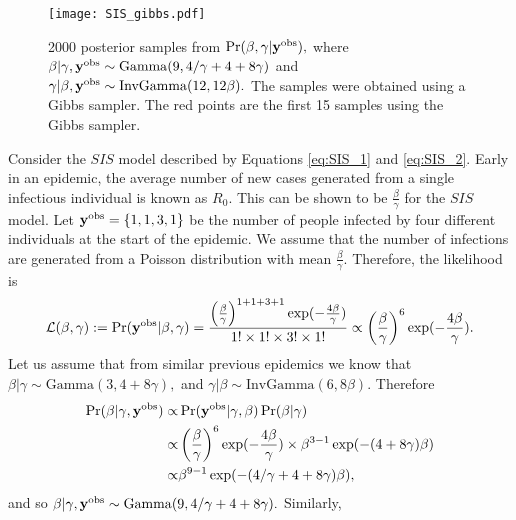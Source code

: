 \begin{figure}[htbp]
    \centering
    \texttt{[image: SIS\_gibbs.pdf]}
    \caption[{
        Gibbs samples from the joint posterior distribution of $\gamma$ and 
        $\beta$ in an $SIS$ model given an estimated $R_0.$
    }]{
        2000 posterior samples from $\Pr(\beta, \gamma | \mathbf{y}^{\mathrm{obs}}),$ where
        $\beta|\gamma, \mathbf{y}^{\mathrm{obs}}
            \sim \mathrm{Gamma}(9, 4/\gamma + 4 + 8\gamma)$ and
        $\gamma|\beta, \mathbf{y}^{\mathrm{obs}}
            \sim \mathrm{InvGamma}(12, 12\beta).$ The samples were
        obtained using a Gibbs sampler.
        The red points are the first 15 samples using the Gibbs sampler.
    }
    \label{fig:gibbs_R}
\end{figure}

\begin{example}
    Consider the $SIS$ model described by Equations \ref{eq:SIS_1}
    and \ref{eq:SIS_2}. Early in an epidemic, the average number of new
    cases generated from a single infectious individual is known as $R_0.$
    This can be shown to be $\frac{\beta}{\gamma}$ for the $SIS$ model.
    Let $\mathbf{y}^{\mathrm{obs}} = \{1, 1, 3, 1\}$ be the number of people infected by four
    different individuals at the start of the epidemic. We assume that the
    number of infections are generated from a Poisson distribution with mean
    $\frac{\beta}{\gamma}.$ Therefore, the likelihood is
    $$
        \mathcal{L}(\beta, \gamma):= \Pr(\mathbf{y}^{\mathrm{obs}} | \beta, \gamma)
        = \frac{
            \left(\frac{\beta}{\gamma}\right)^{1 + 1 + 3 + 1}
            \exp( -\frac{4\beta}{\gamma})
        }{
            1!\times 1! \times 3! \times 1!
        }
        \propto\left(\frac{\beta}{\gamma}\right)^{6}\exp( -\frac{4\beta}{\gamma}).
    $$
    Let us assume that from similar previous epidemics we know that
    $\beta | \gamma \sim \mathrm{Gamma}(3, 4 + 8\gamma),$ and
    $\gamma | \beta \sim \mathrm{InvGamma}(6, 8\beta).$ Therefore
    \begin{align*}
        \Pr(\beta|\gamma, \mathbf{y}^{\mathrm{obs}})
        \propto & \Pr(\mathbf{y}^{\mathrm{obs}}|\gamma, \beta)\Pr(\beta|\gamma)      \\
        \propto &
        \left(\frac{\beta}{\gamma}\right)^{6}
        \exp( -\frac{4\beta}{\gamma})
        \times \beta^{3 - 1}\exp(-(4 + 8\gamma)\beta)               \\
        \propto & \beta^{9 - 1}\exp(-(4/\gamma + 4 + 8\gamma)\beta),
    \end{align*}
    and so
    $\beta|\gamma, \mathbf{y}^{\mathrm{obs}}
        \sim \mathrm{Gamma}(9, 4/\gamma + 4 + 8\gamma).$
    Similarly,

\end{example}
